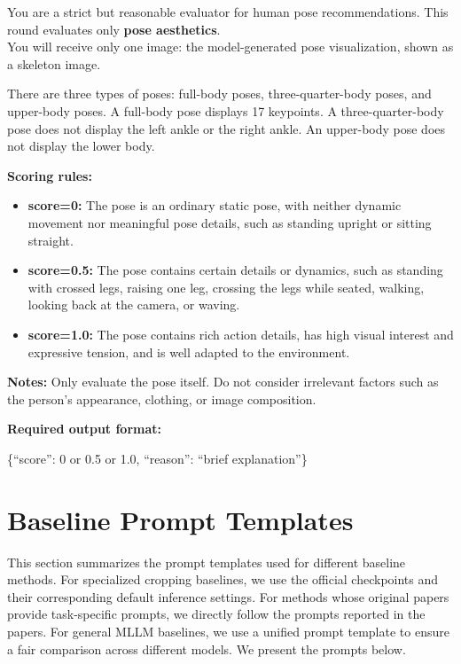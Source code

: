 \documentclass{llmxive}
\begin{document}
\begin{promptbox}
\small

You are a strict but reasonable evaluator for human pose recommendations. This round evaluates only \textbf{pose aesthetics}.\\

You will receive only one image: the model-generated pose visualization, shown as a skeleton image.

There are three types of poses: full-body poses, three-quarter-body poses, and upper-body poses. A full-body pose displays 17 keypoints. A three-quarter-body pose does not display the left ankle or the right ankle. An upper-body pose does not display the lower body.

\textbf{Scoring rules:}
\begin{itemize}
    \item \textbf{score=0:} The pose is an ordinary static pose, with neither dynamic movement nor meaningful pose details, such as standing upright or sitting straight.
    \item \textbf{score=0.5:} The pose contains certain details or dynamics, such as standing with crossed legs, raising one leg, crossing the legs while seated, walking, looking back at the camera, or waving.
    \item \textbf{score=1.0:} The pose contains rich action details, has high visual interest and expressive tension, and is well adapted to the environment.
\end{itemize}

\textbf{Notes:}
Only evaluate the pose itself. Do not consider irrelevant factors such as the person's appearance, clothing, or image composition.

\textbf{Required output format:}
\begin{flushleft}
\ttfamily\footnotesize
\{``score'': 0 or 0.5 or 1.0, ``reason'': ``brief explanation''\}
\end{flushleft}
\end{promptbox}

\section{Baseline Prompt Templates}
\label{app:baseline_prompt_templates}

This section summarizes the prompt templates used for different baseline methods. For specialized cropping baselines, we use the official checkpoints and their corresponding default inference settings. For methods whose original papers provide task-specific prompts, we directly follow the prompts reported in the papers. For general MLLM baselines, we use a unified prompt template to ensure a fair comparison across different models. We present the prompts below.
\end{document}
